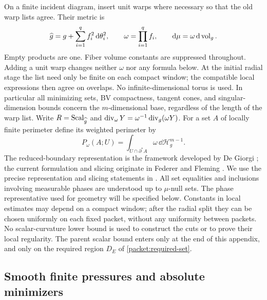 On a finite incident diagram, insert unit warps where necessary so that
the old warp lists agree.  Their metric is
\[
 \widehat g=g+\sum_{i=1}^q f_i^2\,\mathrm d\theta_i^2,
 \qquad \omega=\prod_{i=1}^q f_i,
 \qquad \mathrm d\mu=\omega\,\mathrm d\operatorname{vol}_g.
\]
Empty products are one.  Fiber volume constants are suppressed throughout.
Adding a unit warp changes neither $\omega$ nor any formula below.
At the initial radial stage the list need only be finite on each compact
window; the compatible local expressions then agree on overlaps.  No
infinite-dimensional torus is used.  In particular all minimizing sets,
BV compactness, tangent cones, and singular-dimension bounds concern the
$m$-dimensional base, regardless of the length of the warp list.
Write $R=\operatorname{Scal}_{\widehat g}$ and
$\operatorname{div}_\omega Y=\omega^{-1}\operatorname{div}_g(\omega Y)$.
For a set $A$ of locally finite perimeter define its weighted perimeter by
\[
 P_\omega(A;U)=\int_{U\cap\partial^*A}\omega\,\dd\mathcal H_g^{m-1}.
\]
The reduced-boundary representation is the framework developed by
De Giorgi \citep{deGiorgi1954,deGiorgi1955}; the current formulation
and slicing originate in Federer and Fleming \citep{federerFleming1960}.
We use the precise representation and slicing statements in
\citet[Chapter~3, Section~4, and Chapter~6, Section~4]{simonGMT}.
All set equalities and inclusions involving measurable phases are understood
up to $\mu$-null sets.  The phase representative used for geometry will be
specified below.  Constants in local estimates may depend on a compact
window; after the radial split they can be chosen uniformly on each fixed
packet, without any uniformity between packets.  No scalar-curvature lower bound
is used to construct the cuts or to prove their local regularity.  The
parent scalar bound enters only at the end of this appendix, and only on
the required region $D_E$ of \cref{packet:required-set}.

\subsection{Smooth finite pressures and absolute minimizers}

